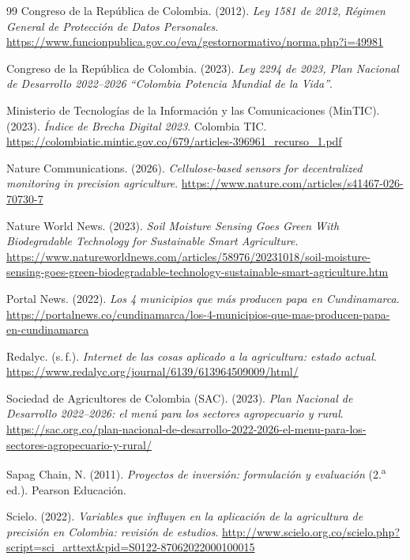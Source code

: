 \documentclass[11pt,a4paper]{article}
\begin{document}
\begin{thebibliography}{99}
 Congreso de la República de Colombia. (2012). \textit{Ley 1581 de 2012, Régimen General de Protección de Datos Personales}. \url{https://www.funcionpublica.gov.co/eva/gestornormativo/norma.php?i=49981}

 Congreso de la República de Colombia. (2023). \textit{Ley 2294 de 2023, Plan Nacional de Desarrollo 2022--2026 ``Colombia Potencia Mundial de la Vida''}.

 Ministerio de Tecnologías de la Información y las Comunicaciones (MinTIC). (2023). \textit{Índice de Brecha Digital 2023}. Colombia TIC. \url{https://colombiatic.mintic.gov.co/679/articles-396961_recurso_1.pdf}

 Nature Communications. (2026). \textit{Cellulose-based sensors for decentralized monitoring in precision agriculture}. \url{https://www.nature.com/articles/s41467-026-70730-7}

 Nature World News. (2023). \textit{Soil Moisture Sensing Goes Green With Biodegradable Technology for Sustainable Smart Agriculture}. \url{https://www.natureworldnews.com/articles/58976/20231018/soil-moisture-sensing-goes-green-biodegradable-technology-sustainable-smart-agriculture.htm}

 Portal News. (2022). \textit{Los 4 municipios que más producen papa en Cundinamarca}. \url{https://portalnews.co/cundinamarca/los-4-municipios-que-mas-producen-papa-en-cundinamarca}

 Redalyc. (s.\,f.). \textit{Internet de las cosas aplicado a la agricultura: estado actual}. \url{https://www.redalyc.org/journal/6139/613964509009/html/}

 Sociedad de Agricultores de Colombia (SAC). (2023). \textit{Plan Nacional de Desarrollo 2022--2026: el menú para los sectores agropecuario y rural}. \url{https://sac.org.co/plan-nacional-de-desarrollo-2022-2026-el-menu-para-los-sectores-agropecuario-y-rural/}

 Sapag Chain, N. (2011). \textit{Proyectos de inversión: formulación y evaluación} (2.\textsuperscript{a} ed.). Pearson Educación.

 Scielo. (2022). \textit{Variables que influyen en la aplicación de la agricultura de precisión en Colombia: revisión de estudios}. \url{http://www.scielo.org.co/scielo.php?script=sci_arttext&pid=S0122-87062022000100015}


\end{thebibliography}
\end{document}
